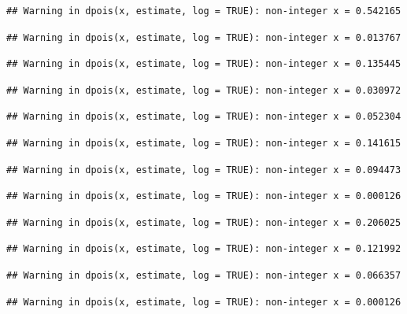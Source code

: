 \documentclass[]{article}
\begin{document}
\begin{verbatim}
## Warning in dpois(x, estimate, log = TRUE): non-integer x = 0.542165
\end{verbatim}

\begin{verbatim}
## Warning in dpois(x, estimate, log = TRUE): non-integer x = 0.013767
\end{verbatim}

\begin{verbatim}
## Warning in dpois(x, estimate, log = TRUE): non-integer x = 0.135445
\end{verbatim}

\begin{verbatim}
## Warning in dpois(x, estimate, log = TRUE): non-integer x = 0.030972
\end{verbatim}

\begin{verbatim}
## Warning in dpois(x, estimate, log = TRUE): non-integer x = 0.052304
\end{verbatim}

\begin{verbatim}
## Warning in dpois(x, estimate, log = TRUE): non-integer x = 0.141615
\end{verbatim}

\begin{verbatim}
## Warning in dpois(x, estimate, log = TRUE): non-integer x = 0.094473
\end{verbatim}

\begin{verbatim}
## Warning in dpois(x, estimate, log = TRUE): non-integer x = 0.000126
\end{verbatim}

\begin{verbatim}
## Warning in dpois(x, estimate, log = TRUE): non-integer x = 0.206025
\end{verbatim}

\begin{verbatim}
## Warning in dpois(x, estimate, log = TRUE): non-integer x = 0.121992
\end{verbatim}

\begin{verbatim}
## Warning in dpois(x, estimate, log = TRUE): non-integer x = 0.066357
\end{verbatim}

\begin{verbatim}
## Warning in dpois(x, estimate, log = TRUE): non-integer x = 0.000126
\end{verbatim}
\end{document}
